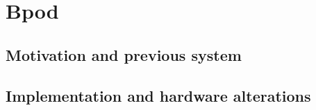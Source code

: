 \section{Bpod}
\label{sec:sectionc}
\subsection{Motivation and previous system}
\label{subsec:subasectionC}

\subsection{Implementation and hardware alterations}
\label{subsec:subbsectionC}